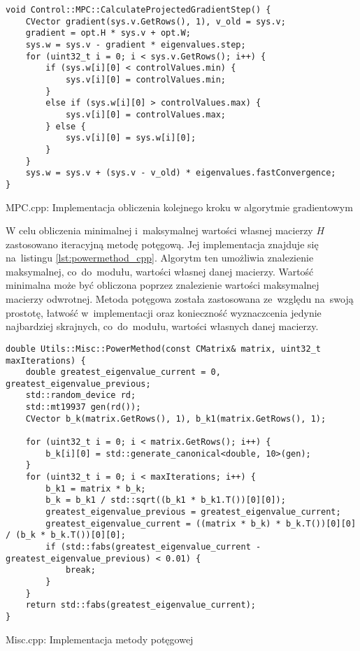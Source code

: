 \begin{listing}[htb]
\begin{verbatim}
void Control::MPC::CalculateProjectedGradientStep() {
    CVector gradient(sys.v.GetRows(), 1), v_old = sys.v;
    gradient = opt.H * sys.v + opt.W;
    sys.w = sys.v - gradient * eigenvalues.step;
    for (uint32_t i = 0; i < sys.v.GetRows(); i++) {
        if (sys.w[i][0] < controlValues.min) {
            sys.v[i][0] = controlValues.min;
        }
        else if (sys.w[i][0] > controlValues.max) {
            sys.v[i][0] = controlValues.max;
        } else {
            sys.v[i][0] = sys.w[i][0];
        }
    }
    sys.w = sys.v + (sys.v - v_old) * eigenvalues.fastConvergence;
}
\end{verbatim}
\caption{MPC.cpp: Implementacja obliczenia kolejnego kroku w algorytmie gradientowym}
\label{lst:step_cpp}
\end{listing}
    
W celu obliczenia minimalnej i~maksymalnej wartości własnej macierzy $H$ zastosowano iteracyjną
metodę potęgową. Jej implementacja znajduje się na~listingu \ref{lst:powermethod_cpp}. Algorytm
ten umożliwia znalezienie maksymalnej, co~do~modułu, wartości własnej danej macierzy. Wartość
minimalna może być obliczona poprzez znalezienie wartości maksymalnej macierzy odwrotnej. Metoda
potęgowa została zastosowana ze~względu na~swoją prostotę, łatwość w~implementacji oraz konieczność
wyznaczcenia jedynie najbardziej skrajnych, co~do~modułu, wartości własnych danej macierzy. \cite{power}
\begin{listing}[htb]
\begin{verbatim}
double Utils::Misc::PowerMethod(const CMatrix& matrix, uint32_t maxIterations) {
    double greatest_eigenvalue_current = 0, greatest_eigenvalue_previous;
    std::random_device rd;
    std::mt19937 gen(rd());
    CVector b_k(matrix.GetRows(), 1), b_k1(matrix.GetRows(), 1);

    for (uint32_t i = 0; i < matrix.GetRows(); i++) {
        b_k[i][0] = std::generate_canonical<double, 10>(gen);
    }
    for (uint32_t i = 0; i < maxIterations; i++) {
        b_k1 = matrix * b_k;
        b_k = b_k1 / std::sqrt((b_k1 * b_k1.T())[0][0]);
        greatest_eigenvalue_previous = greatest_eigenvalue_current;
        greatest_eigenvalue_current = ((matrix * b_k) * b_k.T())[0][0] / (b_k * b_k.T())[0][0];
        if (std::fabs(greatest_eigenvalue_current - greatest_eigenvalue_previous) < 0.01) {
            break;
        }
    }
    return std::fabs(greatest_eigenvalue_current);
}
\end{verbatim}
\caption{Misc.cpp: Implementacja metody potęgowej}
\label{lst:powermethod_cpp}
\end{listing}

